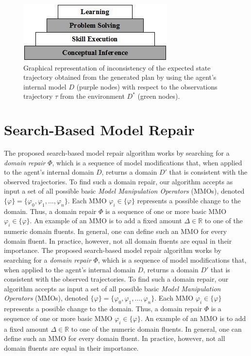 \documentclass[letterpaper]{article} %
\begin{document}
\begin{figure}
\centering
\includegraphics[width=\columnwidth]{cascade.png}
\caption{Graphical representation of inconsistency of the expected state trajectory obtained from the generated plan by using the agent's internal model $D$ (purple nodes) with respect to the observations trajectory $\tau$ from the environment $D^*$ (green nodes).}
\label{fig:inconsistency_trajectory}
\end{figure}






\section{Search-Based Model Repair}




The proposed search-based model repair algorithm works by searching for a \emph{domain repair} $\varPhi$, which is a sequence of model modifications that, when applied to the agent's internal domain $D$, returns a domain $D'$ that is consistent with the observed trajectories.
To find such a domain repair, our algorithm accepts as input a set of all possible basic \emph{Model Manipulation Operators} (MMOs), denoted $\{\varphi\} = \{\varphi_0, \varphi_1, ... , \varphi_n\}$. Each MMO $\varphi_i \in \{\varphi\}$ represents a possible change to the domain. Thus, a domain repair $\varPhi$ is a sequence of one or more basic MMO $\varphi_i \in \{\varphi\}$. An example of an MMO is to add a fixed amount $\Delta\in\mathbb{R}$ to one of the numeric domain fluents.
In general, one can define such an MMO for every domain fluent. In practice, however, not all domain fluents are equal in their importance.
The proposed search-based model repair algorithm works by searching for a \emph{domain repair} $\varPhi$, which is a sequence of model modifications that, when applied to the agent's internal domain $D$, returns a domain $D'$ that is consistent with the observed trajectories.
To find such a domain repair, our algorithm accepts as input a set of all possible basic \emph{Model Manipulation Operators} (MMOs), denoted $\{\varphi\} = \{\varphi_0, \varphi_1, ... , \varphi_n\}$. Each MMO $\varphi_i \in \{\varphi\}$ represents a possible change to the domain. Thus, a domain repair $\varPhi$ is a sequence of one or more basic MMO $\varphi_i \in \{\varphi\}$. An example of an MMO is to add a fixed amount $\Delta\in\mathbb{R}$ to one of the numeric domain fluents.
In general, one can define such an MMO for every domain fluent. In practice, however, not all domain fluents are equal in their importance.
\end{document}

